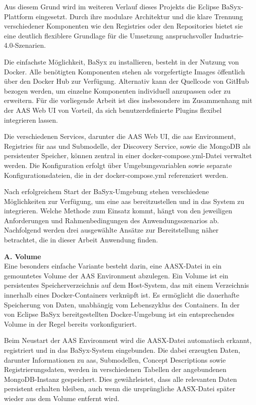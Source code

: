 Aus diesem Grund wird im weiteren Verlauf dieses Projekts die Eclipse BaSyx-Plattform eingesetzt.
Durch ihre modulare Architektur und die klare Trennung verschiedener Komponenten wie den Registries oder den 
Repositories bietet sie eine deutlich flexiblere Grundlage für die Umsetzung anspruchsvoller Industrie-4.0-Szenarien.

Die einfachste Möglichkeit, BaSyx zu installieren, besteht in der Nutzung von Docker.
Alle benötigten Komponenten stehen als vorgefertigte Images öffentlich über den Docker Hub \cite{BaSyxDockerHub} zur Verfügung. 
Alternativ kann der Quellcode von GitHub \cite{BaSyxGithub} bezogen werden, um einzelne Komponenten individuell anzupassen oder zu erweitern.
Für die vorliegende Arbeit ist dies insbesondere im Zusammenhang mit der AAS Web UI von Vorteil, da sich benutzerdefinierte Plugins flexibel integrieren lassen.

Die verschiedenen Services, darunter die AAS Web UI, die \acs{aas} Environment, Registries für \acs{aas} und Submodelle, der Discovery Service, sowie die MongoDB als persistenter Speicher, können zentral in einer docker-compose.yml-Datei verwaltet werden.
Die Konfiguration erfolgt über Umgebungsvariablen sowie separate Konfigurationsdateien, die in der docker-compose.yml referenziert werden.

Nach erfolgreichem Start der BaSyx-Umgebung stehen verschiedene Möglichkeiten zur Verfügung, um eine \acs{aas} bereitzustellen und in das System zu integrieren. 
Welche Methode zum Einsatz kommt, hängt von den jeweiligen Anforderungen und Rahmenbedingungen des Anwendungsszenarios ab.
Nachfolgend werden drei ausgewählte Ansätze zur Bereitstellung näher betrachtet, die in dieser Arbeit Anwendung finden.

\vspace{0.5em}
\noindent\textbf{A. Volume}\\[0.5em]
Eine besonders einfache Variante besteht darin, eine AASX-Datei in ein gemountetes \mbox{Volume} der AAS Environment abzulegen.
Ein Volume ist ein persistentes Speicherverzeichnis auf dem Host-System, das mit einem Verzeichnis innerhalb eines Docker-Containers verknüpft ist.
Es ermöglicht die dauerhafte Speicherung von Daten, unabhängig vom Lebenszyklus des Containers.
In der von Eclipse BaSyx bereitgestellten Docker-Umgebung ist ein entsprechendes Volume in der Regel bereits vorkonfiguriert.

Beim Neustart der AAS Environment wird die AASX-Datei automatisch erkannt, registriert und in das BaSyx-System eingebunden.
Die dabei erzeugten Daten, darunter Informationen zu \acs{aas}, Submodellen, Concept Descriptions sowie Registrierungsdaten, werden in verschiedenen Tabellen der angebundenen MongoDB-Instanz gespeichert.
Dies gewährleistet, dass alle relevanten Daten persistent erhalten bleiben, auch wenn die ursprüngliche AASX-Datei später wieder aus dem Volume entfernt wird.

